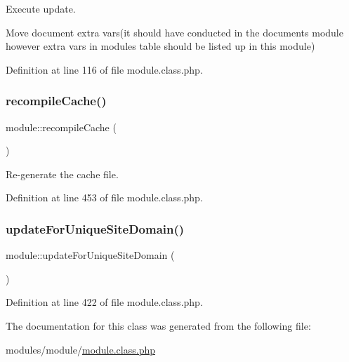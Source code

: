 Execute update. 

Move document extra vars(it should have conducted in the documents module however extra vars in modules table should be listed up in this module)

Definition at line 116 of file module.\+class.\+php.

\mbox{\label{classmodule_ad7b18470ccd972960f4a5ce81c7760ce}} 
\subsubsection{\texorpdfstring{recompile\+Cache()}{recompileCache()}}
{\footnotesize\ttfamily module\+::recompile\+Cache (\begin{DoxyParamCaption}{ }\end{DoxyParamCaption})}



Re-\/generate the cache file. 



Definition at line 453 of file module.\+class.\+php.

\mbox{\label{classmodule_a935bc2073b87fe979b8c1c7221174448}} 
\subsubsection{\texorpdfstring{update\+For\+Unique\+Site\+Domain()}{updateForUniqueSiteDomain()}}
{\footnotesize\ttfamily module\+::update\+For\+Unique\+Site\+Domain (\begin{DoxyParamCaption}{ }\end{DoxyParamCaption})}



Definition at line 422 of file module.\+class.\+php.



The documentation for this class was generated from the following file\+:\begin{DoxyCompactItemize}
\item 
modules/module/\hyperlink{module_8class_8php}{module.\+class.\+php}\end{DoxyCompactItemize}

